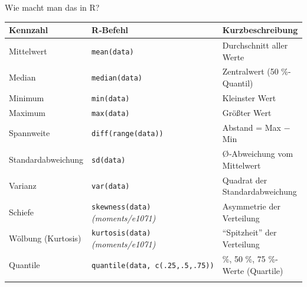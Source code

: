 \documentclass[
  ignorenonframetext,
]{beamer}
\newcounter{none} %
\begin{document}
\begin{frame}[fragile]{Wie macht man das in R?}
\protect{}\label{wie-macht-man-das-in-r}
{\def\LTcaptype{none} %
\begin{longtable}[]{@{}
  >{\raggedright\arraybackslash}p{}
  >{\raggedright\arraybackslash}p{}
  >{\raggedright\arraybackslash}p{}@{}}
\toprule\noalign{}
\begin{minipage}[b]{\linewidth}\raggedright
Kennzahl
\end{minipage} & \begin{minipage}[b]{\linewidth}\raggedright
R‑Befehl
\end{minipage} & \begin{minipage}[b]{\linewidth}\raggedright
Kurzbeschreibung
\end{minipage} \\
\midrule\noalign{}
\endhead
Mittelwert & \texttt{mean(data)} & Durchschnitt aller Werte \\
Median & \texttt{median(data)} & Zentralwert (50 \%-Quantil) \\
Minimum & \texttt{min(data)} & Kleinster Wert \\
Maximum & \texttt{max(data)} & Größter Wert \\
Spannweite & \texttt{diff(range(data))} & Abstand = Max − Min \\
Standardabweichung & \texttt{sd(data)} & Ø‑Abweichung vom Mittelwert \\
Varianz & \texttt{var(data)} & Quadrat der Standardabweichung \\
Schiefe & \texttt{skewness(data)} \emph{(moments/e1071)} & Asymmetrie
der Verteilung \\
Wölbung (Kurtosis) & \texttt{kurtosis(data)} \emph{(moments/e1071)} &
``Spitzheit'' der Verteilung \\
Quantile & \texttt{quantile(data,\ c(.25,.5,.75))} & 25 \%, 50 \%, 75
\%-Werte (Quartile) \\
\bottomrule\noalign{}
\end{longtable}
}
\end{frame}
\end{document}
